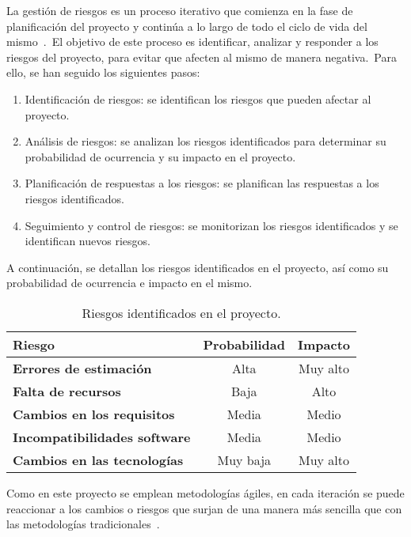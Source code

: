 
La gestión de riesgos es un proceso iterativo que comienza en la fase de planificación del proyecto y continúa a lo
largo de todo el ciclo de vida del mismo~\cite{riesgos_agile}.\ El objetivo de este proceso es identificar, analizar
y responder a los riesgos del proyecto, para evitar que afecten al mismo de manera negativa.\ Para ello, se han seguido
los siguientes pasos:

\begin{enumerate}
	\item Identificación de riesgos: se identifican los riesgos que pueden afectar al proyecto.
	\item Análisis de riesgos: se analizan los riesgos identificados para determinar su probabilidad de ocurrencia y su
	impacto en el proyecto.
	\item Planificación de respuestas a los riesgos: se planifican las respuestas a los riesgos identificados.
	\item Seguimiento y control de riesgos: se monitorizan los riesgos identificados y se identifican nuevos riesgos.
\end{enumerate}
\label{itm:riesgos_pasos}

A continuación, se detallan los riesgos identificados en el proyecto, así como su probabilidad de ocurrencia e impacto
en el mismo.

\begin{table}[H]
	\centering
	\caption{Riesgos identificados en el proyecto.}
	\begin{tabular}{lcc}
		\toprule
		\textbf{Riesgo}                    & \textbf{Probabilidad} & \textbf{Impacto} \\
		\midrule
		\textbf{Errores de estimación}       & Alta                  & Muy alto         \\
		\textbf{Falta de recursos}           & Baja                  & Alto             \\
		\textbf{Cambios en los requisitos}   & Media                 & Medio            \\
		\textbf{Incompatibilidades software} & Media                 & Medio            \\
		\textbf{Cambios en las tecnologías}  & Muy baja              & Muy alto         \\
		\bottomrule
	\end{tabular}
	\label{tab:riesgos_identificados}
\end{table}

Como en este proyecto se emplean metodologías ágiles, en cada iteración se puede reaccionar a los cambios o riesgos
que surjan de una manera más sencilla que con las metodologías tradicionales~\cite{Lagestion42:online}.
